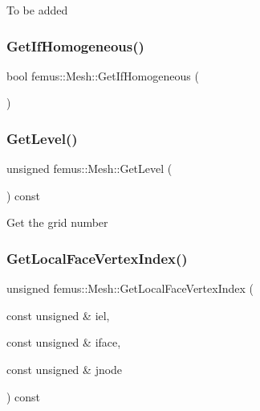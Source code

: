 To be added \mbox{\label{classfemus_1_1_mesh_abb0857c7d1bed5fa1a0ab54b090d4a00}} 
\subsubsection{\texorpdfstring{Get\+If\+Homogeneous()}{GetIfHomogeneous()}}
{\footnotesize\ttfamily bool femus\+::\+Mesh\+::\+Get\+If\+Homogeneous (\begin{DoxyParamCaption}{ }\end{DoxyParamCaption})\hspace{0.3cm}{\ttfamily [inline]}}

\mbox{\label{classfemus_1_1_mesh_a24f5ab73a260d61b0ea9ff28f03bc815}} 
\subsubsection{\texorpdfstring{Get\+Level()}{GetLevel()}}
{\footnotesize\ttfamily unsigned femus\+::\+Mesh\+::\+Get\+Level (\begin{DoxyParamCaption}{ }\end{DoxyParamCaption}) const\hspace{0.3cm}{\ttfamily [inline]}}

Get the grid number \mbox{\label{classfemus_1_1_mesh_ad18fca5dab8c3567b644996e682043d3}} 
\subsubsection{\texorpdfstring{Get\+Local\+Face\+Vertex\+Index()}{GetLocalFaceVertexIndex()}}
{\footnotesize\ttfamily unsigned femus\+::\+Mesh\+::\+Get\+Local\+Face\+Vertex\+Index (\begin{DoxyParamCaption}\item[{const unsigned \&}]{iel,  }\item[{const unsigned \&}]{iface,  }\item[{const unsigned \&}]{jnode }\end{DoxyParamCaption}) const}

